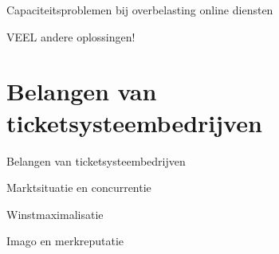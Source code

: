 \documentclass{beamer}
\begin{document}
\begin{frame}{Capaciteitsproblemen bij overbelasting online diensten}
    \begin{center}
        \alert{\Huge{VEEL andere oplossingen!}}
    \end{center}
\end{frame}


\section[Bedrijfsbelangen]{Belangen van ticketsysteembedrijven}
% 
% 
%   
\begin{frame}{Belangen van ticketsysteembedrijven}
    \begin{itemize}
        \LARGE{
            \item Marktsituatie en concurrentie
            \item Winstmaximalisatie
            \item Imago en merkreputatie
        }
    \end{itemize}
\end{frame}
\end{document}
